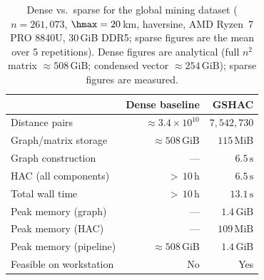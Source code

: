 \begin{table}[t]
\caption{Dense vs.\ sparse for the global mining dataset
  (\(n = 261{,}073\), \(\hmax = 20\)\,km, haversine, AMD Ryzen~7 PRO
  8840U, 30\,GiB DDR5; sparse figures are the mean over 5 repetitions).
  Dense figures are analytical (full \(n^2\) matrix
  \(\approx 508\,\text{GiB}\); condensed vector
  \(\approx 254\,\text{GiB}\)); sparse figures are measured.}
\label{tab:realworld}
\small
\begin{tabular}{lrr}
\toprule
& \textbf{Dense baseline} & \textbf{GSHAC} \\
\midrule
Distance pairs            & \(\approx 3.4 \times 10^{10}\) & \(7{,}542{,}730\) \\
Graph/matrix storage      & \(\approx 508\,\text{GiB}\) & \(115\,\text{MiB}\) \\
Graph construction        & ---                       & \(6.5\,\text{s}\) \\
HAC (all components)      & \(>\,10\,\text{h}\)        & \(6.5\,\text{s}\) \\
Total wall time           & \(>\,10\,\text{h}\)        & \(13.1\,\text{s}\) \\
Peak memory (graph)       & ---                       & \(1.4\,\text{GiB}\) \\
Peak memory (HAC)         & ---                       & \(109\,\text{MiB}\) \\
Peak memory (pipeline)    & \(\approx 508\,\text{GiB}\) & \(1.4\,\text{GiB}\) \\
Feasible on workstation   & No                        & Yes \\
\bottomrule
\end{tabular}
\end{table}